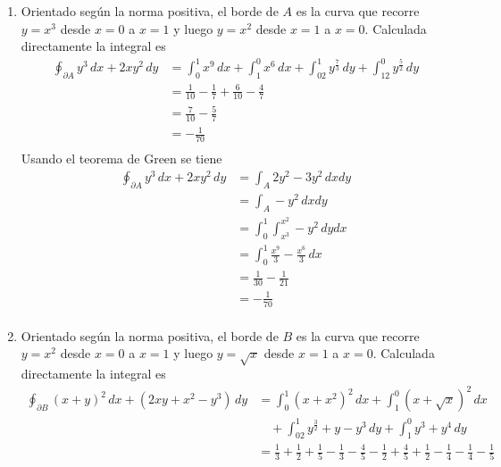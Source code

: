 \begin{enumerate}[label=\alph*)]
    \item Orientado según la norma positiva, el borde de $A$ es la curva que recorre $y=x^3$ desde $x=0$ a $x=1$ y luego $y=x^2$ desde $x=1$ a $x=0$. Calculada directamente la integral es
    \begin{equation}
    \begin{split}
        \oint_{\partial A} y^3\,dx + 2xy^2\,dy &= \int^1_0x^9\,dx+\int^0_1x^6\,dx+\int^1_02y^{\frac{7}{3}}\,dy+\int^0_12y^{\frac{5}{2}}\,dy\\
        &= \frac{1}{10}-\frac{1}{7}+\frac{6}{10}-\frac{4}{7}\\
        &= \frac{7}{10}-\frac{5}{7}\\
        &= -\frac{1}{70}\\
    \end{split}
    \nonumber
    \end{equation}
    Usando el teorema de Green se tiene
    \begin{equation}
    \begin{split}
        \oint_{\partial A} y^3\,dx + 2xy^2\,dy &=
        \int_A 2y^2-3y^2\,dxdy\\
        &= \int_A -y^2\,dxdy\\
        &= \int^1_0\int^{x^2}_{x^3}-y^2\,dydx\\
        &= \int^1_0 \frac{x^9}{3}-\frac{x^6}{3} \,dx\\
        &= \frac{1}{30}-\frac{1}{21}\\
        &= -\frac{1}{70}\\
    \end{split}
    \nonumber
    \end{equation}
    \item Orientado según la norma positiva, el borde de $B$ es la curva que recorre $y=x^2$ desde $x=0$ a $x=1$ y luego $y=\sqrt{x}$ desde $x=1$ a $x=0$. Calculada directamente la integral es
    \begin{equation}
    \begin{split}
        \oint_{\partial B} (x+y)^2\,dx + (2xy+x^2-y^3)\,dy &= \int^1_0(x+x^2)^2\,dx+\int^0_1(x+\sqrt{x})^2\,dx\\
        &\,\,\,\,\,\,+\int^1_02y^{\frac{3}{2}}+y-y^3\,dy+
        \int^0_1y^3+y^4\,dy\\
        &= \frac{1}{3}+\frac{1}{2}+\frac{1}{5}-\frac{1}{3}-
        \frac{4}{5}-\frac{1}{2}+\frac{4}{5}+\frac{1}{2}-
        \frac{1}{4}-\frac{1}{4}-\frac{1}{5}\\

\end{split}
\end{equation}
\end{enumerate}

